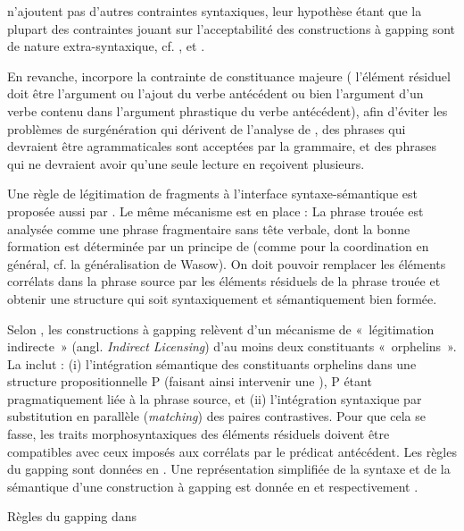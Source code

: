 \citet{SagEtAl1985} n’ajoutent pas d’autres contraintes syntaxiques, leur hypothèse étant que la plupart des contraintes jouant sur l’acceptabilité des constructions à gapping sont de nature extra-syntaxique, cf. \citet{Hankamer1973}, \citet{Kuno1976} et \citet{Sag1976}. 

En revanche, \citet{Gardent1991} incorpore la contrainte de constituance majeure ({\cad} l’élément résiduel doit être l’argument ou l’ajout du verbe antécédent ou bien l’argument d’un verbe contenu dans l’argument phrastique du verbe antécédent), afin d’éviter les problèmes de surgénération qui dérivent de l’analyse de \citet{SagEtAl1985}, {\cad} des phrases qui devraient être agrammaticales sont acceptées par la grammaire, et des phrases qui ne devraient avoir qu’une seule lecture en reçoivent plusieurs.  

 
Une règle de légitimation de fragments à l’interface syntaxe-sémantique est proposée aussi par \citet{CulicoverEtAl2005}. Le même mécanisme est en place : La phrase trouée est analysée comme une phrase fragmentaire sans tête verbale, dont la bonne formation est déterminée par un principe de  (comme pour la coordination en général, cf. la généralisation de Wasow). On doit pouvoir remplacer les éléments corrélats dans la phrase source par les éléments résiduels de la phrase trouée et obtenir une structure qui soit syntaxiquement et sémantiquement bien formée. 

Selon \citet{CulicoverEtAl2005}, les constructions à gapping relèvent d’un mécanisme de «~légitimation indirecte~» (angl. \textit{Indirect Licensing}) d’au moins deux constituants «~orphelins~». La  inclut : (i) l’intégration sémantique des constituants orphelins dans une structure propositionnelle P (faisant ainsi intervenir une ), P étant pragmatiquement liée à la phrase source, et (ii) l’intégration syntaxique par substitution en parallèle (\textit{matching}) des paires contrastives. Pour que cela se fasse, les traits morphosyntaxiques des éléments résiduels doivent être compatibles avec ceux imposés aux corrélats par le prédicat antécédent. Les règles du gapping sont données en . Une représentation simplifiée de la syntaxe et de la sémantique d’une construction à gapping est donnée en  et respectivement .

\ea \label{ch2:ex245}
Règles du gapping dans \citet{CulicoverEtAl2005} 

